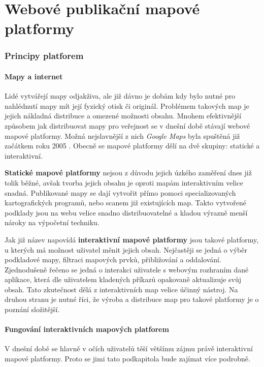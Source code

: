 \newpage
\part{Webové publikační mapové platformy}
\newpage
\section{Principy platforem}

\subsection{Mapy a internet}
Lidé vytvářejí mapy odjakživa, ale již dávno je dobám kdy bylo nutné pro nahlédnutí mapy mít její fyzický otisk či originál. Problémem takových map je jejich nákladná distribuce a omezené možnosti obsahu. Mnohem efektivnější způsobem jak distribuovat mapy pro veřejnost se v dnešní době stávají webové mapové platformy. Možná nejslavnější z nich \textit{Google Maps} byla spuštěná již začátkem roku 2005 \cite{google_history}.
Obecně se mapové platformy dělí na dvě skupiny: statické a interaktivní.

\textbf{Statické mapové platformy} nejsou z důvodu jejich úzkého zaměření dnes již tolik běžné, avšak tvorba jejich obsahu je oproti mapám interaktivním velice snadná. Publikované mapy se dají vytvořit přímo pomoci specializovaných kartografických programů, nebo scanem již existujících map. Takto vytvořené podklady jsou na webu velice snadno distribuovatelné a kladou výrazně menší nároky na výpočetní techniku.

Jak již název napovídá \textbf{interaktivní mapové platformy} jsou takové platformy, u kterých má možnost uživatel měnit jejich obsah. Nejčastěji se jedná o výběr podkladové mapy, filtraci mapových prvků, přibližování a oddalování. Zjednodušeně řečeno se jedná o interakci uživatele s webovým rozhraním dané aplikace, která dle uživatelem kladených příkazů opakovaně aktualizuje svůj obsah\cite{web_mapping}. Tato zkutečnost dělá z interaktivních map velice účinný nástroj. Na druhou stranu je nutné říci, že výroba a distribuce map pro takové platformy je o poznání složitější. 

\newpage
\subsection{Fungování interaktivních mapových platforem}
V dnešní době se hlavně v očích uživatelů těší většímu zájmu právě interaktivní mapové platformy. Proto se jimi tato podkapitola bude zajímat více podrobně. 

